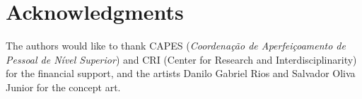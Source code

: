 \documentclass{sigchi}
\begin{document}
\section{Acknowledgments}
    The authors would like to thank CAPES (\textit{Coordena\c{c}\~ao de
    Aperfei\c{c}oamento de Pessoal de N\'ivel Superior}) and CRI (Center for
    Research and Interdisciplinarity) for the financial support, and the artists
    Danilo Gabriel Rios and Salvador Oliva Junior for the concept art.

%
%
%
%
%
\balance



\end{document}

